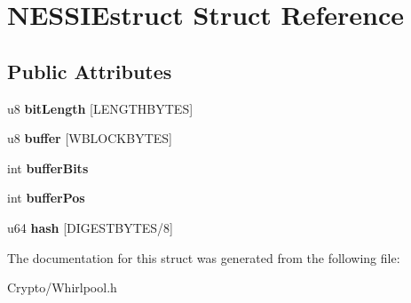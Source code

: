 \hypertarget{struct_n_e_s_s_i_estruct}{}\section{N\+E\+S\+S\+I\+Estruct Struct Reference}
\label{struct_n_e_s_s_i_estruct}
\subsection*{Public Attributes}
\begin{DoxyCompactItemize}
\item 
\mbox{\label{struct_n_e_s_s_i_estruct_ad0530e8b6840061bffabc2b244af3923}} 
u8 {\bfseries bit\+Length} \mbox{[}L\+E\+N\+G\+T\+H\+B\+Y\+T\+ES\mbox{]}
\item 
\mbox{\label{struct_n_e_s_s_i_estruct_ac52a1bce30ce731d8dc66b07986d9e04}} 
u8 {\bfseries buffer} \mbox{[}W\+B\+L\+O\+C\+K\+B\+Y\+T\+ES\mbox{]}
\item 
\mbox{\label{struct_n_e_s_s_i_estruct_aa55f5f9b992b4d1937b88125171b3886}} 
int {\bfseries buffer\+Bits}
\item 
\mbox{\label{struct_n_e_s_s_i_estruct_a9bf66bb21e68e6dce08efd3671ec0f13}} 
int {\bfseries buffer\+Pos}
\item 
\mbox{\label{struct_n_e_s_s_i_estruct_a2736107035063134f67f3e956889b30b}} 
u64 {\bfseries hash} \mbox{[}D\+I\+G\+E\+S\+T\+B\+Y\+T\+ES/8\mbox{]}
\end{DoxyCompactItemize}


The documentation for this struct was generated from the following file\+:\begin{DoxyCompactItemize}
\item 
Crypto/Whirlpool.\+h\end{DoxyCompactItemize}
